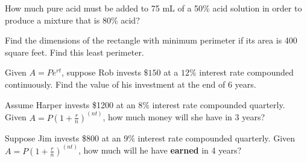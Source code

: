 \documentclass[addpoints]{exam}
\begin{document}
\begin{questions}
    
    \newpage
    
    \question[1] How much pure acid must be added to 75 mL of a 50\% acid solution in order to produce a mixture that is 80\% acid? 
    
    \question[1] Find the dimensions of the rectangle with minimum perimeter if its area is 400 square feet. Find this least perimeter. 
    
    
    \question[1] Given $A = Pe^{rt}$, suppose Rob invests $\$150$ at a $12\%$ interest rate compounded continuously. Find the value of his investment at the end of 6 years. 
    
    \question[1] Assume Harper invests \$1200 at an 8\% interest rate compounded quarterly. 
    \newline Given $A = P(1 + \frac{r}{n})^{(nt)}$, how much money will she have in 3 years?
    
    \question[1] Suppose Jim invests \$800 at an 9\% interest rate compounded quarterly. 
    \newline Given $A = P(1 + \frac{r}{n})^{(nt)}$, how much will he have \textbf{earned} in 4 years? 
    

\end{questions}
\end{document}
